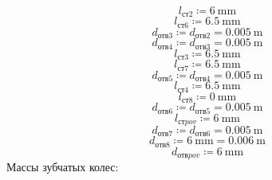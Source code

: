 \documentclass{article}
\newcommand{\defeq}{\coloneq} %
\begin{document}
\begin{equation*}
\textit{l}_{\textit{ст2}} \defeq 6 \: \mathrm{mm}
\end{equation*}
\begin{equation*}
\textit{l}_{\textit{ст6}} \defeq 6.5 \: \mathrm{mm}
\end{equation*}
\begin{equation*}
\textit{d}_{\textit{отв3}} \defeq \textit{d}_{\textit{отв2}} = {0.005 \: \mathrm{m}}
\end{equation*}
\begin{equation*}
\textit{d}_{\textit{отв4}} \defeq \textit{d}_{\textit{отв3}} = {0.005 \: \mathrm{m}}
\end{equation*}
\begin{equation*}
\textit{l}_{\textit{ст3}} \defeq 6.5 \: \mathrm{mm}
\end{equation*}
\begin{equation*}
\textit{l}_{\textit{ст7}} \defeq 6.5 \: \mathrm{mm}
\end{equation*}
\begin{equation*}
\textit{d}_{\textit{отв5}} \defeq \textit{d}_{\textit{отв4}} = {0.005 \: \mathrm{m}}
\end{equation*}
\begin{equation*}
\textit{l}_{\textit{ст4}} \defeq 6.5 \: \mathrm{mm}
\end{equation*}
\begin{equation*}
\textit{l}_{\textit{ст8}} \defeq 0 \: \mathrm{mm}
\end{equation*}
\begin{equation*}
\textit{d}_{\textit{отв6}} \defeq \textit{d}_{\textit{отв5}} = {0.005 \: \mathrm{m}}
\end{equation*}
\begin{equation*}
l_{стpov} \defeq 6 \: \mathrm{mm}
\end{equation*}
\begin{equation*}
\textit{d}_{\textit{отв7}} \defeq \textit{d}_{\textit{отв6}} = {0.005 \: \mathrm{m}}
\end{equation*}
\begin{equation*}
\textit{d}_{\textit{отв8}} \defeq 6 \: \mathrm{mm} = {0.006 \: \mathrm{m}}
\end{equation*}
\begin{equation*}
d_{отвpov} \defeq 6 \: \mathrm{mm}
\end{equation*}
\colorbox[HTML]{000000}{Массы зубчатых колес:}\newline
\end{document}
